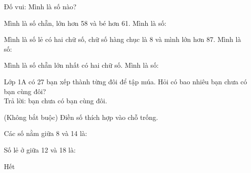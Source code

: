 \documentclass[../main.tex]{subfiles}
\begin{document}
\begin{bt}
    Đố vui: Mình là số nào?
    \begin{listEX}
        \item Mình là số chẵn, lớn hơn 58 và bé hơn 61. Mình là số: \TTcham[2cm]
        \item Mình là số lẻ có hai chữ số, chữ số hàng chục là 8 và mình lớn hơn 87. Mình là số: \TTcham[2cm]
        \item Mình là số chẵn lớn nhất có hai chữ số. Mình là số: \TTcham[2cm]
        \item Lớp 1A có 27 bạn xếp thành từng đôi để tập múa. Hỏi có bao nhiêu bạn chưa có bạn cùng đôi?\\[4pt]
        Trả lời: \TTcham[3cm] bạn chưa có bạn cùng đôi.
    \end{listEX}
\end{bt}

\begin{bt}
    (Không bắt buộc) Điền số thích hợp vào chỗ trống.
    \begin{listEX}
        \item {}
        \item Các số nằm giữa 8 và 14 là: \TTcham[5cm]
        \item {}
        \item {}
        \item Số lẻ ở giữa 12 và 18 là: \TTcham[3cm]
    \end{listEX}
\end{bt}

\begin{center}
       \faGg\faGg\quad Hết \quad\faGg\faGg
\end{center}
\clearpage
\makeatletter\let\@textbottom\SSluutextbottom\makeatother
\end{document}
